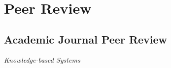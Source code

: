 \documentclass[11pt,letterpaper]{report}
\newcommand{\listitemspace}{0.25em}
\renewenvironment{itemize}
{\begin{list}{}{\setlength{\leftmargin}{0em}
                \setlength{\parskip}{0em}
                \setlength{\itemsep}{\listitemspace}
                \setlength{\parsep}{\listitemspace}}}
{\end{list}}
\begin{document}
%
%
%

%
%
%



    \section*{Peer Review}

    \subsection*{Academic Journal Peer Review}

    \begin{itemize}

        \item \textit{Knowledge-based Systems}


    \end{itemize}
%
%
%
%
%
%
%
%
\end{document}
